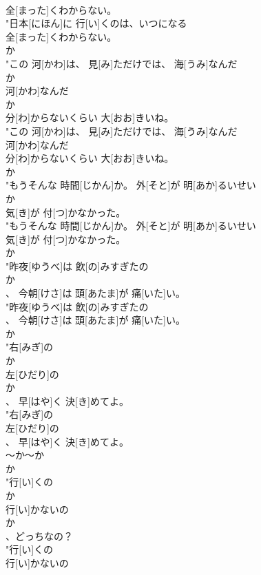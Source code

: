\documentclass[8pt]{extreport}
\begin{document}
\begin{CJK}{UTF8}{min}
\\	全[まった]くわからない。
\\	"日本[にほん]に 行[い]くのは、いつになる
\\	全[まった]くわからない。
\\	か
\\	"この 河[かわ]は、 見[み]ただけでは、 海[うみ]なんだ
\\	か
\\	河[かわ]なんだ
\\	か
\\	分[わ]からないくらい 大[おお]きいね。
\\	"この 河[かわ]は、 見[み]ただけでは、 海[うみ]なんだ
\\	河[かわ]なんだ
\\	分[わ]からないくらい 大[おお]きいね。
\\	か
\\	"もうそんな 時間[じかん]か。 外[そと]が 明[あか]るいせい
\\	か
\\	気[き]が 付[つ]かなかった。
\\	"もうそんな 時間[じかん]か。 外[そと]が 明[あか]るいせい
\\	気[き]が 付[つ]かなかった。
\\	か
\\	"昨夜[ゆうべ]は 飲[の]みすぎたの
\\	か
\\	、 今朝[けさ]は 頭[あたま]が 痛[いた]い。
\\	"昨夜[ゆうべ]は 飲[の]みすぎたの
\\	、 今朝[けさ]は 頭[あたま]が 痛[いた]い。
\\	か
\\	"右[みぎ]の
\\	か
\\	左[ひだり]の
\\	か
\\	、 早[はや]く 決[き]めてよ。
\\	"右[みぎ]の
\\	左[ひだり]の
\\	、 早[はや]く 決[き]めてよ。
\\	～か～か 
\\	か
\\	"行[い]くの
\\	か
\\	行[い]かないの
\\	か
\\	、どっちなの？
\\	"行[い]くの
\\	行[い]かないの

\end{CJK}
\end{document}
